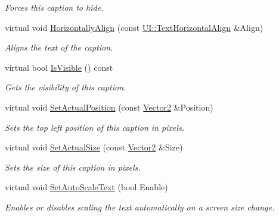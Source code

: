 \begin{DoxyCompactItemize}
\begin{DoxyCompactList}\small\item\em Forces this caption to hide. \item\end{DoxyCompactList}\item 
virtual void \hyperlink{classMezzanine_1_1UI_1_1Caption_a5d2537a5d2e7b327a3ea36fdb75fd77c}{HorizontallyAlign} (const \hyperlink{namespaceMezzanine_1_1UI_aebbd46e62bb20d958f1915c1ec6cc549}{UI::TextHorizontalAlign} \&Align)
\begin{DoxyCompactList}\small\item\em Aligns the text of the caption. \item\end{DoxyCompactList}\item 
virtual bool \hyperlink{classMezzanine_1_1UI_1_1Caption_a5d6ed066e714024ce9b12b13a926e6c6}{IsVisible} () const 
\begin{DoxyCompactList}\small\item\em Gets the visibility of this caption. \item\end{DoxyCompactList}\item 
virtual void \hyperlink{classMezzanine_1_1UI_1_1Caption_a7360c698bc7a0aaa365739ccb0100d8d}{SetActualPosition} (const \hyperlink{classMezzanine_1_1Vector2}{Vector2} \&Position)
\begin{DoxyCompactList}\small\item\em Sets the top left position of this caption in pixels. \item\end{DoxyCompactList}\item 
virtual void \hyperlink{classMezzanine_1_1UI_1_1Caption_afef14a7641a40656b1bb6d3ae1c820ca}{SetActualSize} (const \hyperlink{classMezzanine_1_1Vector2}{Vector2} \&Size)
\begin{DoxyCompactList}\small\item\em Sets the size of this caption in pixels. \item\end{DoxyCompactList}\item 
virtual void \hyperlink{classMezzanine_1_1UI_1_1Caption_a9f8c1df0391939b5a4b740515ebe0df8}{SetAutoScaleText} (bool Enable)
\begin{DoxyCompactList}\small\item\em Enables or disables scaling the text automatically on a screen size change. \item\end{DoxyCompactList}\item 

\end{DoxyCompactItemize}
